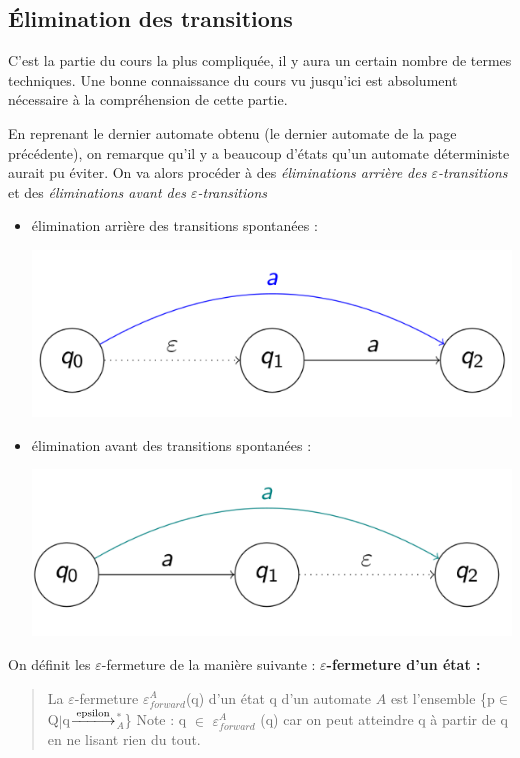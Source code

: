 \documentclass{article}
\begin{document}
\subsection{Élimination des transitions}
C'est la partie du cours la plus compliquée, il y aura un certain nombre de termes techniques. Une bonne connaissance du cours vu jusqu'ici est absolument nécessaire à la compréhension de cette partie.\par
En reprenant le dernier automate obtenu (le dernier automate de la page précédente), on remarque qu'il y a beaucoup d'états qu'un automate déterministe aurait pu éviter. On va alors procéder à des \textit{éliminations arrière des $\varepsilon$-transitions} et des \textit{éliminations avant des $\varepsilon$-transitions}
\begin{itemize}
    \item élimination arrière des transitions spontanées :
    \begin{center}
        \includegraphics[scale=0.3]{Image9.png}
    \end{center}    
    \item élimination avant des transitions spontanées :
    \begin{center}
        \includegraphics[scale=0.3]{Image10.png}
    \end{center}
\end{itemize}

On définit les $\varepsilon$-fermeture de la manière suivante :\newline\newline
\textbf{$\varepsilon$-fermeture d'un état :}
\begin{quote}
    La $\varepsilon$-fermeture $\varepsilon_{forward}^{A}$(q) d'un état q d'un automate $A$ est l'ensemble \{p$\in$Q$|$q$\xlongrightarrow{\text{epsilon}}$$_{A}^{*}$\}\newline
    Note : q $\in$ $\varepsilon_{forward}^{A}$ (q) car on peut atteindre q à partir de q en ne lisant rien du tout.
\end{quote}
\end{document}
